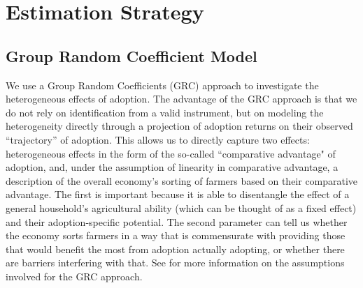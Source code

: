 \documentclass[11pt]{article}
\begin{document}
\section{Estimation Strategy}\label{sec:strategy}

\subsection{Group Random Coefficient Model}

We use a Group Random Coefficients (GRC) approach to investigate the heterogeneous effects of adoption. The advantage of the GRC approach is that we do not rely on identification from a valid instrument, but on modeling the heterogeneity directly through a projection of adoption returns on their observed ``trajectory'' of adoption. This allows us to directly capture two effects: heterogeneous effects in the form of the so-called ``comparative advantage" of adoption, and, under the assumption of linearity in comparative advantage, a description of the overall economy's sorting of farmers based on their comparative advantage. The first is important because it is able to disentangle the effect of a general household's agricultural ability (which can be thought of as a fixed effect) and their adoption-specific potential. The second parameter can tell us whether the economy sorts farmers in a way that is commensurate with providing those that would benefit the most from adoption actually adopting, or whether there are barriers interfering with that. See \cite{Tjernstrom_Emilia_Dalia_Ghanem_Oscar_Barriga_Cabanillas_Travis_J_Lybbert_Jeffrey_D_Michler_and_Aleksandr_Michuda2020-bc} for more information on the assumptions involved for the GRC approach. 


\end{document}
